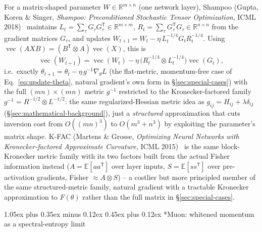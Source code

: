 \documentclass[10pt,twocolumn]{article}
\makeatletter
\renewcommand\subsection{\@startsection{subsection}{2}{0pt}%
  {1.05ex plus 0.35ex minus 0.12ex}%
  {0.45ex plus 0.12ex}%
  {\normalsize\bfseries}}
\makeatother
\begin{document}
For a matrix-shaped parameter $W\in\mathbb R^{m\times n}$ (one network layer),
Shampoo (Gupta, Koren \& Singer, \emph{Shampoo: Preconditioned Stochastic
Tensor Optimization}, ICML 2018)~\cite{gupta2018shampoo} maintains
$L_t=\sum_\tau G_\tau G_\tau^{\mathsf T}\in\mathbb R^{m\times m}$,
$R_t=\sum_\tau G_\tau^{\mathsf T} G_\tau\in\mathbb R^{n\times n}$ from the
gradient matrices $G_\tau$, and updates $W_{t+1}=W_t-\eta\,
L_t^{-1/4}G_tR_t^{-1/4}$. Using
$\operatorname{vec}(AXB)=(B^{\mathsf T}\otimes A)\operatorname{vec}(X)$, this is
\begin{equation}
\operatorname{vec}(W_{t+1}) = \operatorname{vec}(W_t) - \eta\,
\big(R_t^{-1/4}\otimes L_t^{-1/4}\big)\operatorname{vec}(G_t),
\label{eq:shampoo}
\end{equation}
i.e.\ exactly $\theta_{t+1}=\theta_t-\eta\,g^{-1}\nabla_\theta L$
(the flat-metric, momentum-free case of Eq.~\eqref{eq:update-theta}, natural
gradient's own form in \S\ref{sec:special-cases}) with the full
$(mn)\times(mn)$ metric $g^{-1}$ restricted to the Kronecker-factored family
$g^{-1}=R^{-1/2}\otimes L^{-1/2}$: the same regularized-Hessian metric idea
as $g_{ij}=H_{ij}+\lambda\delta_{ij}$ (\S\ref{sec:mathematical-background}),
just a \emph{structured} approximation that cuts inversion cost from
$O((mn)^3)$ to $O(m^3+n^3)$ by exploiting the parameter's matrix shape. K-FAC
(Martens \& Grosse, \emph{Optimizing Neural Networks with Kronecker-factored
Approximate Curvature}, ICML 2015)~\cite{martens2015kfac} is the same
block-Kronecker metric family with its two factors built from the actual
Fisher information instead ($A=\mathbb E[aa^{\mathsf T}]$ over layer inputs,
$S=\mathbb E[ss^{\mathsf T}]$ over pre-activation gradients, Fisher
$\approx A\otimes S$) -- a costlier but more principled member of the same
structured-metric family, natural gradient with a tractable Kronecker
approximation to $F(\theta)$ rather than the full matrix in
\S\ref{sec:special-cases}.

\subsection*{Muon: whitened momentum as a spectral-entropy limit}
\end{document}
